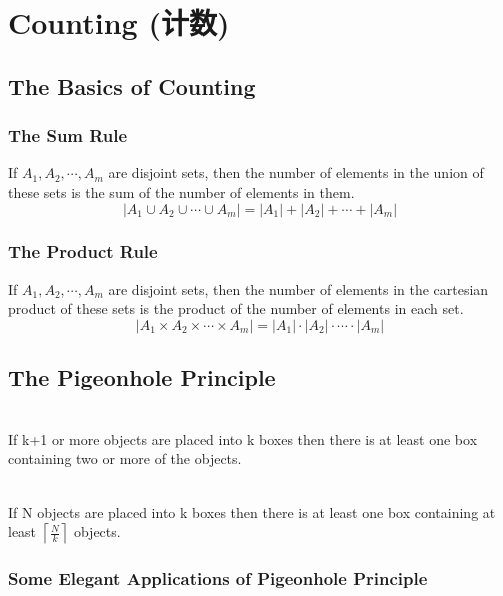 \section[Counting]{Counting (计数)}
\subsection{The Basics of Counting}

\subsubsection{The Sum Rule}
\begin{theorem}
    If $A_1,A_2,\cdots,A_m$ are disjoint sets, then the number of elements in the union of these sets is the sum of the number of elements in them.
    \[ \left| A_1\cup A_2\cup \cdots \cup A_m \right|=|A_1|+|A_2|+\cdots+|A_m| \]
\end{theorem}

\subsubsection{The Product Rule}
\begin{theorem}
    If $A_1,A_2,\cdots,A_m$ are disjoint sets, then the number of elements in the cartesian product of these sets is the product of the number of elements in each set. 
    \[ \left| A_1\times A_2\times \cdots \times A_m \right|=|A_1|\cdot |A_2|\cdot \cdots\cdot |A_m| \]
\end{theorem}

\subsection{The Pigeonhole Principle}
\begin{theorem}\quad \\
    If k+1 or more objects are placed into k boxes then there is at least one box containing two or more of the objects. 
\end{theorem}

\begin{theorem}\quad \\
    If N objects are placed into k boxes then there is at least one box containing at least $\left\lceil \frac{N}{k} \right\rceil$ objects. 
\end{theorem}

\subsubsection{Some Elegant Applications of Pigeonhole Principle}

